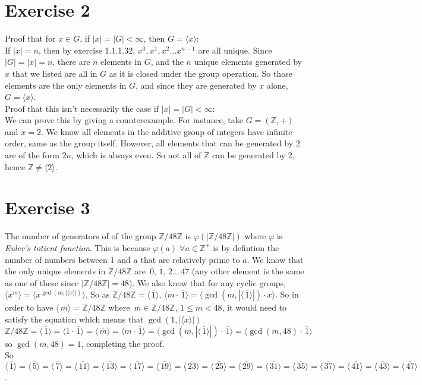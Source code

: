 \documentclass[12pt]{article}
\newcommand{\Z}{\mathbb{Z}}
\newcommand{\olsi}[1]{\,\overline{\!{#1}}}
\begin{document}
    
    \section*{Exercise 2}
    Proof that for $x \in G$, if $|x| = |G| < \infty$,
    then $G = \langle x \rangle:$ \\
    If $|x| = n$,
    then by exercise 1.1.1.32,
    $x^0, x^1, x^2 \dots x^{n-1}$ are all unique.
    Since $|G| = |x| = n$,
    there are $n$ elements in $G$,
    and the $n$ unique elements generated by $x$ that we listed
    are all in $G$ as it is closed under the group operation.
    So those elements are the only elements in $G$,
    and since they are generated by $x$ alone, 
    $G = \langle x \rangle$. \\
    Proof that this isn't necessarily the case if $|x| = |G| < \infty$: \\
    We can prove this by giving a counterexample.
    For instance, take $G = (\Z, +)$ and $x = 2$.
    We know all elements in the additive group of integers have
    infinite order,
    same as the group itself.
    However, all elements that can be generated by 2 are of the form $2n$,
    which is always even.
    So not all of $\Z$ can be generated by 2,
    hence $\Z \neq \langle 2 \rangle$.


    \section*{Exercise 3}
    The number of generators of of the group $\Z/48\Z$
    is $\varphi(|\Z/48\Z|)$ where $\varphi$
    is \textit{Euler's totient function}.
    This is because $\varphi(a) \; \forall a \in \Z^+$
    is by defintion the number of numbers between 1 and $a$
    that are relatively prime to $a$.
    We know that the only unique elements in $\Z/48\Z$
    are $\olsi{0}, \olsi{1}, \olsi{2} \dots \olsi{47}$
    (any other element is the same as one of these since $|\Z/48\Z| = 48$).
    We also know that for any cyclic groups,
    $\langle x^m \rangle = \langle x^{\gcd(m, |\langle x \rangle|)} \rangle$,
    So as $\Z/48\Z = \langle \olsi{1} \rangle$,
    $\langle m \cdot \olsi{1} \rangle
    = \langle \gcd(m, |\langle \olsi{1} \rangle|) \cdot x \rangle$.
    So in order to have $\langle \olsi{m} \rangle = \Z/48\Z$
    where $\olsi{m} \in \Z/48\Z$, $1 \leqslant m < 48$,
    it would need to satisfy the equation
    which means that $\gcd(1, |\langle x \rangle|)$
    \[ \Z/48\Z = \langle \olsi{1} \rangle
    =  \langle 1 \cdot \olsi{1} \rangle
    =  \langle \olsi{m} \rangle
    =  \langle m \cdot \olsi{1} \rangle
    =  \langle \gcd(m, |\langle \olsi{1} \rangle|) \cdot \olsi{1} \rangle
    =  \langle \gcd(m, 48) \cdot \olsi{1} \rangle \]
    so $\gcd(m, 48) = 1$,
    completing the proof. \\
    So $\langle \olsi{1} \rangle
    = \langle \olsi{5} \rangle = \langle \olsi{7} \rangle
    = \langle \olsi{11} \rangle = \langle \olsi{13} \rangle
    = \langle \olsi{17} \rangle = \langle \olsi{19} \rangle
    = \langle \olsi{23} \rangle = \langle \olsi{25} \rangle
    = \langle \olsi{29} \rangle = \langle \olsi{31} \rangle
    = \langle \olsi{35} \rangle = \langle \olsi{37} \rangle
    = \langle \olsi{41} \rangle = \langle \olsi{43} \rangle
    = \langle \olsi{47} \rangle$.
\end{document}
